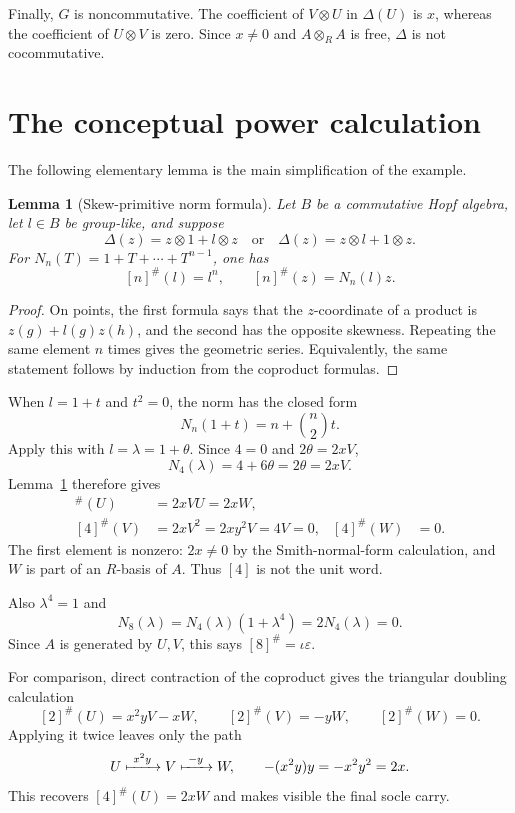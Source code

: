 \documentclass[11pt]{article}
\newtheorem{lemma}[theorem]{Lemma}
\theoremstyle{remark}
\newcommand{\eps}{\varepsilon}
\newcommand{\ot}{\otimes}
\begin{document}
Finally, $G$ is noncommutative.  The coefficient of $V\ot U$ in
$\Delta(U)$ is $x$, whereas the coefficient of $U\ot V$ is zero.  Since
$x\ne0$ and $A\ot_R A$ is free, $\Delta$ is not cocommutative.

\section{The conceptual power calculation}

The following elementary lemma is the main simplification of the example.

\begin{lemma}[Skew-primitive norm formula]\label{lem:norm}
Let $B$ be a commutative Hopf algebra, let $l\in B$ be group-like, and
suppose
\[
 \Delta(z)=z\ot1+l\ot z
 \quad\text{or}\quad
 \Delta(z)=z\ot l+1\ot z.
\]
For $N_n(T)=1+T+\cdots+T^{n-1}$, one has
\[
 [n]^\#(l)=l^n,
 \qquad [n]^\#(z)=N_n(l)z.
\]
\end{lemma}

\begin{proof}
On points, the first formula says that the $z$-coordinate of a product is
$z(g)+l(g)z(h)$, and the second has the opposite skewness.  Repeating the
same element $n$ times gives the geometric series.  Equivalently, the same
statement follows by induction from the coproduct formulas.
\end{proof}

When $l=1+t$ and $t^2=0$, the norm has the closed form
\begin{equation}\label{eq:binomial-norm}
 N_n(1+t)=n+\binom n2t.
\end{equation}
Apply this with $l=\lambda=1+\theta$.  Since $4=0$ and
$2\theta=2xV$,
\begin{equation}\label{eq:N4}
 N_4(\lambda)=4+6\theta=2\theta=2xV.
\end{equation}
Lemma~\ref{lem:norm} therefore gives
\begin{align}
 [4]^\#(U)&=2xVU=2xW,\nonumber\\
 [4]^\#(V)&=2xV^2=2xy^2V=4V=0,
 & [4]^\#(W)&=0.\label{eq:fourth}
\end{align}
The first element is nonzero: $2x\ne0$ by the Smith-normal-form calculation,
and $W$ is part of an $R$-basis of $A$.  Thus $[4]$ is not the unit word.

Also $\lambda^4=1$ and
\[
 N_8(\lambda)=N_4(\lambda)(1+\lambda^4)=2N_4(\lambda)=0.
\]
Since $A$ is generated by $U,V$, this says $[8]^\#=\iota\eps$.

For comparison, direct contraction of the coproduct gives the triangular
doubling calculation
\begin{equation}\label{eq:doubling}
 [2]^\#(U)=x^2yV-xW,
 \qquad [2]^\#(V)=-yW,
 \qquad [2]^\#(W)=0.
\end{equation}
Applying it twice leaves only the path
\[
 U\xmapsto{\ x^2y\ }V\xmapsto{\ -y\ }W,
 \qquad -(x^2y)y=-x^2y^2=2x.
\]
This recovers $[4]^\#(U)=2xW$ and makes visible the final socle carry.
\end{document}
